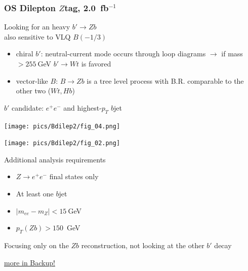 \documentclass[xcolor=dvipsnames,10pt]{beamer}
\newcommand{\ifb}{~fb$^{-1}$}
\begin{document}
\begin{frame}\frametitle{OS Dilepton $Z$tag, 2.0\ifb~\cite{:2012aka}} %
\footnotesize\centering

\begin{minipage}{.5\textwidth}
\centering

Looking for an heavy \alert{$b'\rightarrow Zb$}\\
also sensitive to \alert{VLQ $B(-1/3)$}\\

\scriptsize 
\begin{itemize}
\item chiral $b'$: neutral-current mode occurs through \alert{loop diagrams} $\rightarrow$ if mass $>255~$GeV $b'\rightarrow Wt$ is favored
\item vector-like $B$: $B\rightarrow Zb$ is a \alert{tree level} process with B.R. comparable to the other two ($Wt, Hb$)
\end{itemize}

\alert{$b'$ candidate}: $e^+e^-$ and highest-$p_T$ $b$jet

\texttt{[image: pics/Bdilep2/fig\_04.png]}

\end{minipage}\begin{minipage}{.5\textwidth}
\centering

\texttt{[image: pics/Bdilep2/fig\_02.png]}


Additional analysis requirements

\scriptsize
\begin{itemize}
\item $Z\rightarrow e^+e^-$ final states \alert{only}
\item At least one $b$jet
\item $|m_{ee} - m_Z|<15~$GeV
\item $p_T(Zb)>150$~GeV
\end{itemize}

Focusing only on the $Zb$ reconstruction, not looking at the other $b'$ decay

\vspace{-\baselineskip}
\begin{flushright}\scriptsize \hyperlink{Bdilep2}{more in Backup!}\end{flushright}


\end{minipage}

\end{frame}
\end{document}
